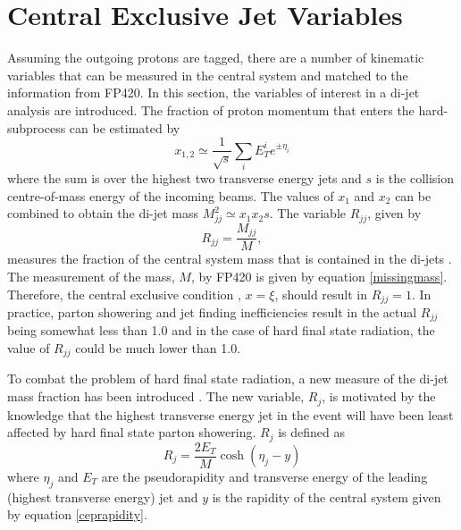 \section{Central Exclusive Jet Variables} \label{excvars}

Assuming the outgoing protons are tagged, there are a number of kinematic variables that can be measured in the central system and matched to the information from FP420. In this section, the variables of interest in a di-jet analysis are introduced. The fraction of proton momentum that enters the hard-subprocess can be estimated by
\begin{equation}
x_{1, 2} \simeq \frac{1}{\sqrt{s}} \sum_i E_{T}^i e^{\pm \eta_i}
\end{equation}
where the sum is over the highest two transverse energy jets \cite{Collins:1997nm, Affolder:2000hd} and $s$ is the collision centre-of-mass energy of the incoming beams. The values of $x_1$ and $x_2$ can be combined to obtain the di-jet mass $M_{jj}^2 \simeq x_1x_2s$. The variable $R_{jj}$, given by
\begin{equation}
R_{jj} = \frac{M_{jj}}{M},
\end{equation}
measures the fraction of the central system mass that is contained in the di-jets \cite{Affolder:2000hd}. The measurement of the mass, $M$, by FP420 is given by equation \ref{missingmass}. Therefore, the central exclusive condition , $x=\xi$, should result in $R_{jj}=1$. In practice, parton showering and jet finding inefficiencies result in the actual $R_{jj}$ being somewhat less than 1.0 and in the case of hard final state radiation, the value of $R_{jj}$ could be much lower than 1.0.

To combat the problem of hard final state radiation, a new measure of the di-jet mass fraction has been introduced \cite{Khoze:2006iw}. The new variable, $R_j$, is motivated by the knowledge that the highest transverse energy jet in the event will have been least affected by hard final state parton showering. $R_j$ is defined as 
\begin{equation}
R_j = \frac{2E_T}{M}\cosh\left(\eta_j - y \right)
\end{equation}
where $\eta_j$ and $E_T$ are the pseudorapidity and transverse energy  of the leading (highest transverse energy) jet and $y$ is the rapidity of the central system given by equation \ref{ceprapidity}.

